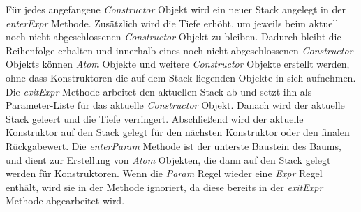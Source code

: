 Für jedes angefangene \textit{Constructor} Objekt wird ein neuer Stack angelegt in der \textit{enterExpr} Methode.
Zusätzlich wird die Tiefe erhöht, um jeweils beim aktuell noch nicht abgeschlossenen \textit{Constructor} Objekt zu bleiben.
Dadurch bleibt die Reihenfolge erhalten und innerhalb eines noch nicht abgeschlossenen \textit{Constructor} Objekts können
\textit{Atom} Objekte und weitere \textit{Constructor} Objekte erstellt werden, ohne dass Konstruktoren die
auf dem Stack liegenden Objekte in sich aufnehmen.
\newline
\newline
Die \textit{exitExpr} Methode arbeitet den aktuellen Stack ab und setzt ihn als Parameter-Liste für das
aktuelle \textit{Constructor} Objekt.
Danach wird der aktuelle Stack geleert und die Tiefe verringert.
Abschließend wird der aktuelle Konstruktor auf den Stack gelegt für den nächsten Konstruktor oder
den finalen Rückgabewert.
\newline
\newline
Die \textit{enterParam} Methode ist der unterste Baustein des Baums,
und dient zur Erstellung von \textit{Atom} Objekten, die dann auf den Stack gelegt werden für Konstruktoren.
Wenn die \textit{Param} Regel wieder eine \textit{Expr} Regel enthält, wird sie in der Methode ignoriert,
da diese bereits in der \textit{exitExpr} Methode abgearbeitet wird.

\newpage